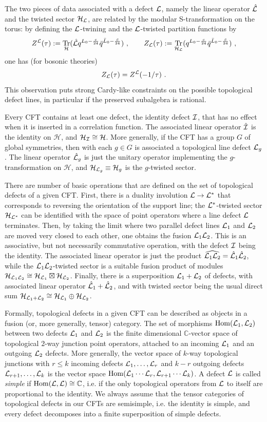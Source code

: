\documentclass[11pt,reqno]{article}
\newcommand{\be}{\begin{equation}}
\newcommand{\ee}{\end{equation}}
\newcommand{\CH}{\mathcal{H}}
\newcommand{\CI}{{\cal I}}
\newcommand{\CL}{{\cal L}}
\DeclareMathOperator{\Tr}{Tr}
\newcommand{\CC}{\mathbb{C}}
\DeclareMathOperator{\Hom}{Hom}
\begin{document}
The two pieces of data associated with a defect $\CL$, namely the linear operator $\hat\CL$ and the twisted sector $\CH_\CL$, are related by the modular S-transformation on the torus: by defining the $\CL$-twining and the $\CL$-twisted partition functions by
\be Z^\CL(\tau):=\Tr_{\CH}(\hat\CL q^{L_0-\frac{c}{24}}{\bar q}^{\bar L_0-\frac{\bar c}{24}})\ ,\qquad Z_\CL(\tau):=\Tr_{\CH_\CL}(q^{L_0-\frac{c}{24}}{\bar q}^{\bar L_0-\frac{\bar c}{24}})\ ,
\ee one has (for bosonic theories)
\be Z_\CL(\tau)=Z^\CL(-1/\tau)\ .
\ee
This observation puts strong Cardy-like constraints on the possible topological defect lines, in particular if the preserved subalgebra is rational.

Every CFT contains at least one defect, the identity defect $\CI$, that has no effect when it is inserted in a correlation function. The associated linear operator $\hat\CI$ is the identity on $\CH$, and $\CH_\CI\cong \CH$. More generally, if the CFT has a group $G$ of global symmetries, then with each $g\in G$ is associated a topological line defect $\CL_g$. The linear operator $\hat\CL_g$ is just the unitary operator implementing the $g$-transformation on $\CH$, and $\CH_{\CL_g}\equiv \CH_g$ is the $g$-twisted sector. 

There are number of basic operations that are defined on the set of topological defects of a given CFT. First, there is a duality involution $\CL\to \CL^*$ that corresponds to reversing the orientation of the support line; the $\CL^*$-twisted sector $\CH_{\CL^*}$ can be identified with the space of point operators where a line defect $\CL$ terminates. Then, by taking the limit where two parallel defect lines $\CL_1$ and $\CL_2$ are moved very closed to each other, one obtains the fusion $\CL_1\CL_2$. This is an associative, but not necessarily commutative operation, with the defect $\CI$ being the identity. The associated linear operator is just the product $\widehat{\CL_1\CL_2}=\hat\CL_1\hat\CL_2$, while the $\CL_1\CL_2$-twisted sector is a suitable fusion product of modules $\CH_{\CL_1\CL_2}\cong \CH_{\CL_1}\boxtimes\CH_{\CL_2}$. Finally, there is a superposition $\CL_1+\CL_2$ of defects, with associated linear operator $\hat\CL_1+\hat\CL_2$, and with twisted sector being the usual direct sum $\CH_{\CL_1+\CL_2}\cong \CH_{\CL_1}\oplus \CH_{\CL_2}$.

Formally, topological defects in a given CFT can be described as objects in a fusion (or, more generally, tensor) category. The set of morphisms $\Hom(\CL_1,\CL_2)$ between two defects $\CL_1$ and $\CL_2$ is the finite dimensional $\CC$-vector space of topological $2$-way junction point operators, attached to an incoming $\CL_1$ and an outgoing $\CL_2$ defects. More generally, the vector space of $k$-way topological junctions with $r\le k$ incoming defects $\CL_1,\ldots,\CL_r$ and $k-r$ outgoing defects $\CL_{r+1},\ldots,\CL_{k}$ is the vector space $\Hom(\CL_1\cdots\CL_r,\CL_{r+1}\cdots\CL_k)$. A defect $\CL$ is called \emph{simple} if $\Hom(\CL,\CL)\cong \CC$, i.e. if the only topological operators from $\CL$ to itself are proportional to the identity. We always assume that the tensor categories of topological defects in our CFTs are semisimple, i.e. the identity is simple, and every defect decomposes into a finite superposition of simple defects.
\end{document}
